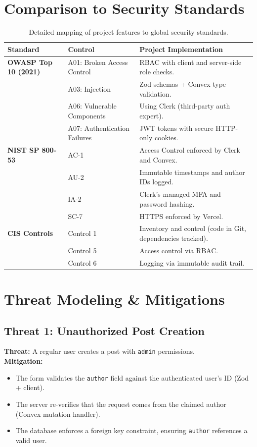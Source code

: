 \documentclass[11pt,a4paper]{article}
\begin{document}
\section{Comparison to Security Standards}

\begin{table}[h!]
\centering
\begin{tabular}{@{}p{3cm}p{4cm}p{6cm}@{}}
\toprule
\textbf{Standard} & \textbf{Control} & \textbf{Project Implementation} \\ \midrule
\textbf{OWASP Top 10 (2021)} & A01: Broken Access Control & RBAC with client and server-side role checks. \\
& A03: Injection & Zod schemas + Convex type validation. \\
& A06: Vulnerable Components & Using Clerk (third-party auth expert). \\
& A07: Authentication Failures & JWT tokens with secure HTTP-only cookies. \\ \midrule
\textbf{NIST SP 800-53} & AC-1 & Access Control enforced by Clerk and Convex. \\
& AU-2 & Immutable timestamps and author IDs logged. \\
& IA-2 & Clerk's managed MFA and password hashing. \\
& SC-7 & HTTPS enforced by Vercel. \\ \midrule
\textbf{CIS Controls} & Control 1 & Inventory and control (code in Git, dependencies tracked). \\
& Control 5 & Access control via RBAC. \\
& Control 6 & Logging via immutable audit trail. \\ \bottomrule
\end{tabular}
\caption{Detailed mapping of project features to global security standards.}
\label{tab:standards}
\end{table}

\section{Threat Modeling \& Mitigations}

\subsection{Threat 1: Unauthorized Post Creation}
\textbf{Threat:} A regular user creates a post with \texttt{admin} permissions.\\
\textbf{Mitigation:} 
\begin{itemize}
    \item The form validates the \texttt{author} field against the authenticated user's ID (Zod + client).
    \item The server re-verifies that the request comes from the claimed author (Convex mutation handler).
    \item The database enforces a foreign key constraint, ensuring \texttt{author} references a valid user.
\end{itemize}
\end{document}
